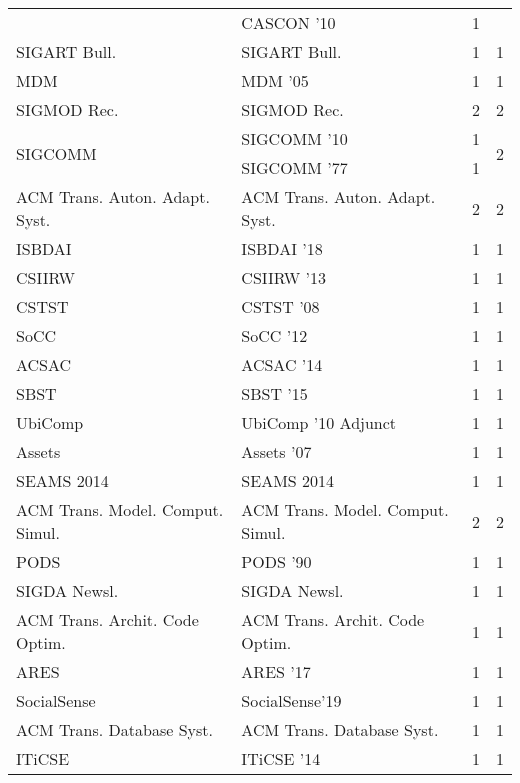 \begin{table*}[t]
\begin{tabular}{llrr}
& CASCON '10 & 1 &\\
\multirow{1}{*}{SIGART Bull.} & SIGART Bull. & 1 & \multirow{1}{*}{1}\\
\multirow{1}{*}{MDM } & MDM '05 & 1 & \multirow{1}{*}{1}\\
\multirow{1}{*}{SIGMOD Rec.} & SIGMOD Rec. & 2 & \multirow{1}{*}{2}\\
\multirow{2}{*}{SIGCOMM } & SIGCOMM '10 & 1 & \multirow{2}{*}{2}\\
& SIGCOMM '77 & 1 &\\
\multirow{1}{*}{ACM Trans. Auton. Adapt. Syst.} & ACM Trans. Auton. Adapt. Syst. & 2 & \multirow{1}{*}{2}\\
\multirow{1}{*}{ISBDAI } & ISBDAI '18 & 1 & \multirow{1}{*}{1}\\
\multirow{1}{*}{CSIIRW } & CSIIRW '13 & 1 & \multirow{1}{*}{1}\\
\multirow{1}{*}{CSTST } & CSTST '08 & 1 & \multirow{1}{*}{1}\\
\multirow{1}{*}{SoCC } & SoCC '12 & 1 & \multirow{1}{*}{1}\\
\multirow{1}{*}{ACSAC } & ACSAC '14 & 1 & \multirow{1}{*}{1}\\
\multirow{1}{*}{SBST } & SBST '15 & 1 & \multirow{1}{*}{1}\\
\multirow{1}{*}{UbiComp } & UbiComp '10 Adjunct & 1 & \multirow{1}{*}{1}\\
\multirow{1}{*}{Assets } & Assets '07 & 1 & \multirow{1}{*}{1}\\
\multirow{1}{*}{SEAMS 2014} & SEAMS 2014 & 1 & \multirow{1}{*}{1}\\
\multirow{1}{*}{ACM Trans. Model. Comput. Simul.} & ACM Trans. Model. Comput. Simul. & 2 & \multirow{1}{*}{2}\\
\multirow{1}{*}{PODS } & PODS '90 & 1 & \multirow{1}{*}{1}\\
\multirow{1}{*}{SIGDA Newsl.} & SIGDA Newsl. & 1 & \multirow{1}{*}{1}\\
\multirow{1}{*}{ACM Trans. Archit. Code Optim.} & ACM Trans. Archit. Code Optim. & 1 & \multirow{1}{*}{1}\\
\multirow{1}{*}{ARES } & ARES '17 & 1 & \multirow{1}{*}{1}\\
\multirow{1}{*}{SocialSense} & SocialSense'19 & 1 & \multirow{1}{*}{1}\\
\multirow{1}{*}{ACM Trans. Database Syst.} & ACM Trans. Database Syst. & 1 & \multirow{1}{*}{1}\\
\multirow{1}{*}{ITiCSE } & ITiCSE '14 & 1 & \multirow{1}{*}{1}\\

\end{tabular}
\end{table*}
